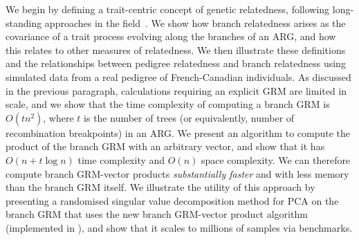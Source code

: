 We begin by defining a trait-centric concept of genetic relatedness, following
long-standing approaches in the 
field~\citep{fisher1919correlation, wright1922coefficients}. 
We show how branch relatedness arises as the
covariance of a trait process evolving along the branches of an ARG, and how
this relates to other measures of relatedness.
We then illustrate these definitions and the relationships between pedigree
relatedness and branch relatedness using simulated data from a real pedigree of
French-Canadian individuals. 
As discussed in the previous paragraph, calculations requiring an explicit 
GRM are limited in scale, and we show that the time complexity of 
computing a branch GRM is 
$O(t n^2)$, where $t$ is the number of trees (or equivalently, number 
of recombination breakpoints) in an ARG.
We present an algorithm to compute the product of the branch GRM with
an arbitrary vector, and show that it has 
$O(n + t \log{n})$ time complexity and $O(n)$ space complexity.
We can therefore compute branch GRM-vector products 
\emph{substantially faster} and with less memory 
than the branch GRM itself.
We illustrate the utility of this approach by presenting a
randomised singular value decomposition method 
for PCA on the branch GRM that
uses the new branch GRM-vector product algorithm (implemented 
in \tskit{}), and show that it scales to millions of samples
via benchmarks.
